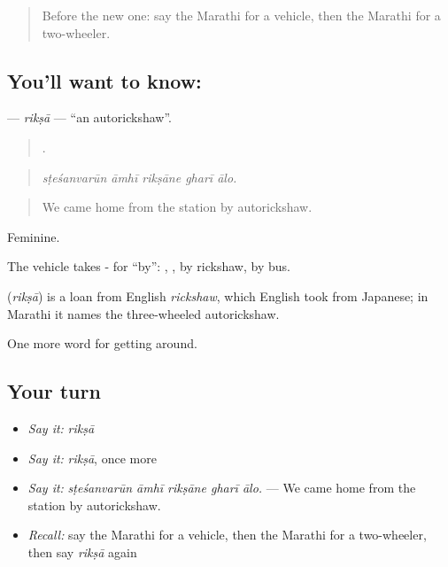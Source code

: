 \label{lesson:MR-C400-riksa}



\begin{quote}
Before the new one: say the Marathi for a vehicle, then the Marathi for a two-wheeler.
\end{quote}

\subsection*{You'll want to know: }
\textbf{} — \emph{rikṣā} — \textquotedblleft{}an autorickshaw\textquotedblright{}.

\begin{quote}
    .
\end{quote}

\begin{quote}
\emph{sṭeśanvarūn āmhī rikṣāne gharī ālo.}
\end{quote}

\begin{quote}
We came home from the station by autorickshaw.
\end{quote}

Feminine.

The vehicle takes - for \textquotedblleft{}by\textquotedblright{}: , , by rickshaw, by bus.

\begin{cousinweb}
\textbf{} (\emph{rikṣā}) is a loan from English \emph{rickshaw}, which English took from Japanese; in Marathi it names the three-wheeled autorickshaw.
\end{cousinweb}

\begin{grammarlens}[title={What you've built}]
One more word for getting around.
\end{grammarlens}

\subsection*{Your turn}
\begin{itemize}
\raggedright
  \item \emph{Say it:} \emph{rikṣā}
  \item \emph{Say it:} \emph{rikṣā}, once more
  \item \emph{Say it:} \emph{sṭeśanvarūn āmhī rikṣāne gharī ālo.} — We came home from the station by autorickshaw.
  \item \emph{Recall:} say the Marathi for a vehicle, then the Marathi for a two-wheeler, then say \emph{rikṣā} again
\end{itemize}

